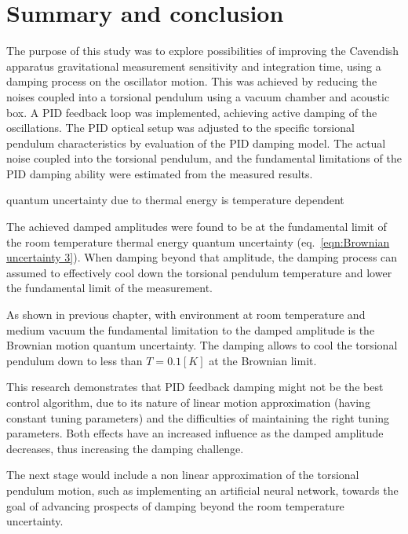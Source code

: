 \documentclass[\main/master.tex]{subfiles}
\begin{document}
\newspacing
\chapter{Summary and conclusion}\label{chapter:Summary and conclusion}
The purpose of this study was to explore possibilities of improving the Cavendish apparatus gravitational measurement sensitivity and integration time, using a damping process on the oscillator motion. This was achieved by reducing the noises coupled into a torsional pendulum using a vacuum chamber and acoustic box. A PID feedback loop was implemented, achieving active damping of the oscillations. The PID optical setup was adjusted to the specific torsional pendulum characteristics by evaluation of the PID damping model. The actual noise coupled into the torsional pendulum, and the fundamental limitations of the PID damping ability were estimated from the measured results.
\par\noindent
quantum uncertainty due to thermal energy is temperature dependent

The achieved damped amplitudes were found to be at the fundamental limit of the room temperature thermal energy quantum uncertainty (eq.~\ref{eqn:Brownian uncertainty 3}). When damping beyond that amplitude, the damping process can assumed to effectively cool down the torsional pendulum temperature and lower the fundamental limit of the measurement. 
\par\noindent
As shown in previous chapter, with environment at room temperature and medium vacuum the fundamental limitation to the damped amplitude is the Brownian motion quantum uncertainty. The damping allows to cool the torsional pendulum down to less than $T=0.1[K]$ at the Brownian limit.
\par\noindent
This research demonstrates that PID feedback damping might not be the best control algorithm, due to its nature of linear motion approximation (having constant tuning parameters) and the difficulties of maintaining the right tuning parameters. Both effects have an increased influence as the damped amplitude decreases, thus increasing the damping challenge.
\par\noindent
The next stage would include a non linear approximation of the torsional pendulum motion, such as implementing an artificial neural network, towards the goal of advancing prospects of damping beyond the room temperature uncertainty. 
\end{document}
